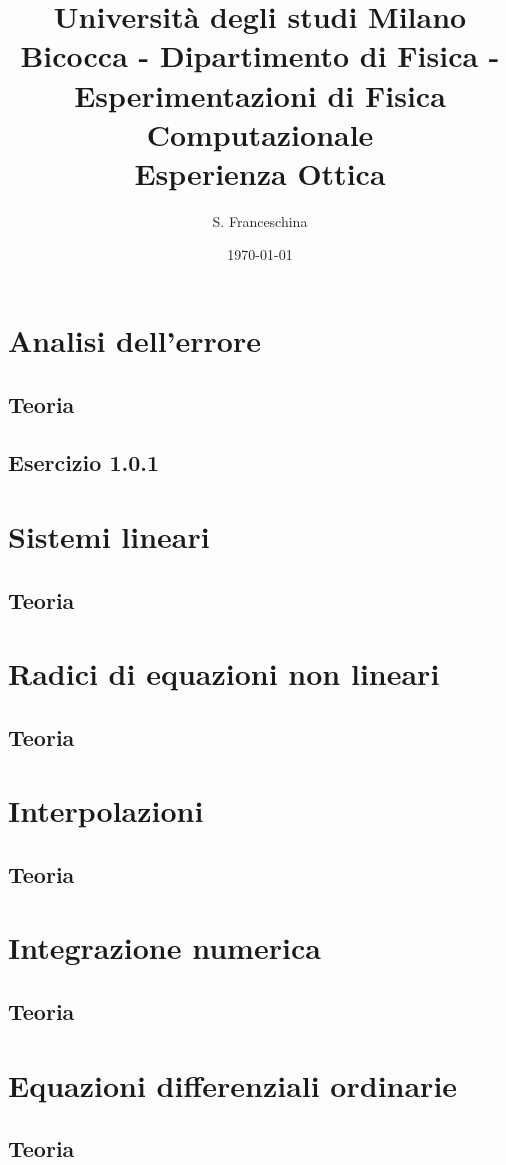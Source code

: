 \documentclass[letterpaper,12pt]{article}
\begin{document}
\title{{\small Università degli studi Milano Bicocca - Dipartimento di Fisica - Esperimentazioni di Fisica Computazionale }\\
	Esperienza Ottica}
\author{S. Franceschina}
\date{\today}
\maketitle
\thispagestyle{logoheader}

\begin{abstract}
	\begin{adjustwidth}{-1cm}{-1cm}
	\end{adjustwidth}
\end{abstract}
\tableofcontents
\newpage

\section{Analisi dell'errore}
\subsection{Teoria}

\subsection{Esercizio 1.0.1}

\section{Sistemi lineari}
\subsection{Teoria}

\section{Radici di equazioni non lineari}
\subsection{Teoria}

\section{Interpolazioni}
\subsection{Teoria}

\section{Integrazione numerica}
\subsection{Teoria}

\section{Equazioni differenziali ordinarie}
\subsection{Teoria}
\end{document}

